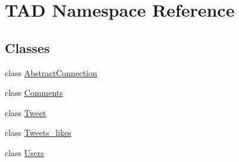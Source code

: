 \hypertarget{namespace_t_a_d}{}\section{T\+AD Namespace Reference}
\label{namespace_t_a_d}
\subsection*{Classes}
\begin{DoxyCompactItemize}
\item 
class \hyperlink{class_t_a_d_1_1_abstract_connection}{Abstract\+Connection}
\item 
class \hyperlink{class_t_a_d_1_1_comments}{Comments}
\item 
class \hyperlink{class_t_a_d_1_1_tweet}{Tweet}
\item 
class \hyperlink{class_t_a_d_1_1_tweets__likes}{Tweets\+\_\+likes}
\item 
class \hyperlink{class_t_a_d_1_1_users}{Users}
\end{DoxyCompactItemize}

